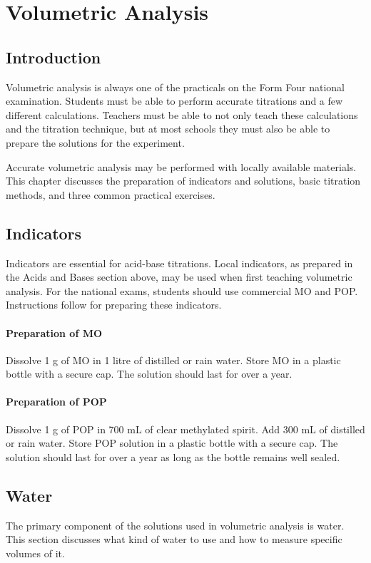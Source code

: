 \chapter{Volumetric Analysis}
\section{Introduction}

Volumetric analysis is always one of the practicals on the Form Four national examination. Students must be able to perform accurate titrations and a few different calculations. Teachers must be able to not only teach these calculations and the titration technique, but at most schools they must also be able to prepare the solutions for the experiment.

Accurate volumetric analysis may be performed with locally available materials. This chapter discusses the preparation of indicators and solutions, basic titration methods, and three common practical exercises.

\section{Indicators}

Indicators are essential for acid-base titrations. Local indicators, as prepared in the Acids and Bases section above, may be used when first teaching volumetric analysis. For the national exams, students should use commercial MO and POP. Instructions follow for preparing these indicators.

\subsubsection{Preparation of MO}
Dissolve 1 g of MO in 1 litre of distilled or rain water. Store MO in a plastic bottle with a secure cap. The solution should last for over a year.

\subsubsection{Preparation of POP}
Dissolve 1 g of POP in 700 mL of clear methylated spirit. Add 300 mL of distilled or rain water. Store POP solution in a plastic bottle with a secure cap. The solution should last for over a year as long as the bottle remains well sealed.

\section{Water}
The primary component of the solutions used in volumetric analysis is water. This section discusses what kind of water to use and how to measure specific volumes of it.

